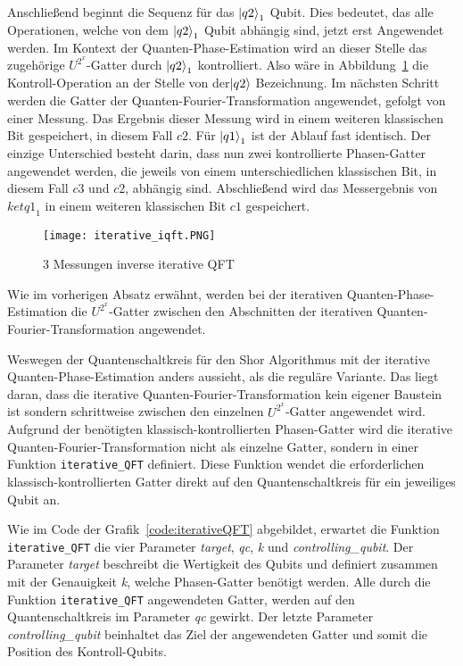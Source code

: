 Anschließend beginnt die Sequenz für das \(\ket{q2}_1\) Qubit.
Dies bedeutet, das alle Operationen, welche von dem \(\ket{q2}_1\) Qubit abhängig sind, 
jetzt erst Angewendet werden.
Im Kontext der Quanten-Phase-Estimation wird an dieser Stelle das zugehörige \(U^{2^x}\)-Gatter durch \(\ket{q2}_1\) kontrolliert.
Also wäre in Abbildung~\ref{fig:iterative_iQFT} die Kontroll-Operation an der Stelle von der\(\ket{q2}\) Bezeichnung.
Im nächsten Schritt werden die Gatter der Quanten-Fourier-Transformation angewendet, gefolgt von einer Messung. 
Das Ergebnis dieser Messung wird in einem weiteren klassischen Bit gespeichert, in diesem Fall \(c2\).
Für \(\ket{q1}_1\) ist der Ablauf fast identisch.
Der einzige Unterschied besteht darin, 
dass nun zwei kontrollierte Phasen-Gatter angewendet werden, 
die jeweils von einem unterschiedlichen klassischen Bit, 
in diesem Fall \(c3\) und \(c2\), abhängig sind.
Abschließend wird das Messergebnis von \(ket{q1}_1\) in einem weiteren klassischen Bit \(c1\) gespeichert.
\begin{figure} [H]
  \caption{3 Messungen inverse iterative QFT}
  \label{fig:iterative_iQFT}
  \texttt{[image: iterative\_iqft.PNG]}
  \centering
  \end{figure}
  
Wie im vorherigen Absatz erwähnt, 
werden bei der iterativen Quanten-Phase-Estimation die \(U^{2^x}\)-Gatter zwischen den Abschnitten 
der iterativen Quanten-Fourier-Transformation angewendet. 

Weswegen der Quantenschaltkreis für den Shor Algorithmus mit der iterative Quanten-Phase-Estimation anders aussieht, 
als die reguläre Variante.
Das liegt daran, dass die iterative Quanten-Fourier-Transformation kein eigener Baustein ist sondern schrittweise zwischen 
den einzelnen \(U^{2^x}\)-Gatter angewendet wird.
Aufgrund der benötigten klassisch-kontrollierten Phasen-Gatter wird die iterative Quanten-Fourier-Transformation nicht als einzelne Gatter, 
sondern in einer Funktion \texttt{iterative\_QFT} definiert.
Diese Funktion wendet die erforderlichen klassisch-kontrollierten Gatter direkt auf den Quantenschaltkreis für ein jeweiliges Qubit an.

Wie im Code der Grafik~\ref{code:iterativeQFT} abgebildet, 
erwartet die Funktion \texttt{iterative\_QFT} die vier Parameter \textit{target}, \textit{qc}, \textit{k} und \textit{controlling\_qubit}.
Der Parameter \textit{target} beschreibt die Wertigkeit des Qubits und 
definiert zusammen mit der Genauigkeit \textit{k}, 
welche Phasen-Gatter benötigt werden.
Alle durch die Funktion \texttt{iterative\_QFT} angewendeten Gatter, 
werden auf den Quantenschaltkreis im Parameter \textit{qc} gewirkt.
Der letzte Parameter \textit{controlling\_qubit} beinhaltet das Ziel der angewendeten Gatter und 
somit die Position des Kontroll-Qubits.

